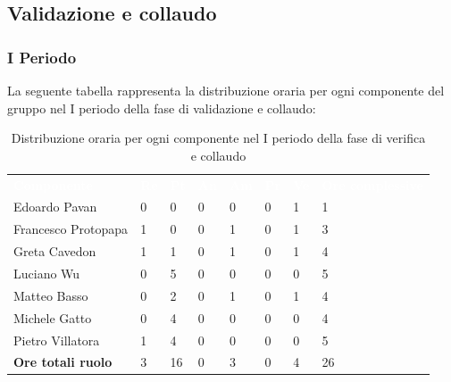 \subsection{Validazione e collaudo}
\subsubsection{I Periodo}
La seguente tabella rappresenta la distribuzione oraria per ogni componente del gruppo nel I periodo della fase di validazione e collaudo:
\begin{table}[H]
\begin{center}
\renewcommand{\arraystretch}{1.25}
\begin{tabular}{ m{}<{\centering}  m{}<{\centering} m{}<{\centering} m{}<{\centering}  m{}<{\centering}  m{}<{\centering}  m{}<{\centering}  m{}<{\centering}   }
	\rowcolor{darkblue}
	\textcolor{white}{\textbf{Componente}} &\textcolor{white}{\textbf{Re}}&\textcolor{white}{\textbf{Pt}}&\textcolor{white}{\textbf{An}}&\textcolor{white}{\textbf{Am}}&\textcolor{white}{\textbf{Pr}}&\textcolor{white}{\textbf{Ve}}&\textcolor{white}{\textbf{Ore complessive}}\\ 
	Edoardo Pavan & 0 & 0 & 0 & 0 & 0 & 1 & 1 \\	
	
	Francesco Protopapa & 1 & 0 & 0 & 1 & 0 & 1 & 3 \\

	Greta Cavedon & 1 & 1 & 0 & 1 & 0 & 1 & 4 \\
	
	Luciano Wu & 0 & 5 & 0 & 0 & 0 & 0 &5 \\
	
	Matteo Basso & 0 & 2 & 0 & 1 & 0 & 1 & 4 \\
	
	Michele Gatto & 0 & 4 & 0 & 0 & 0 & 0 & 4 \\
	
	Pietro Villatora & 1 & 4 & 0 & 0 & 0 & 0 & 5 \\
	
	\textbf{Ore totali ruolo} & 3 & 16 & 0 & 3 & 0 & 4 & 26 \\

\end{tabular}
\caption{Distribuzione oraria per ogni componente nel I periodo della fase di verifica e collaudo}
\end{center}
\end{table}

